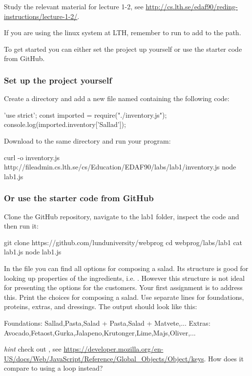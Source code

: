 \documentclass[fleqn, article, a4paper]{memoir}
\begin{document}
\begin{Assignments}

\item Study the relevant material for lecture 1-2, see \url{http://cs.lth.se/edaf90/reding-instructions/lecture-1-2/}. 

\item If you are using the linux system at LTH, remember to run  to add  to the path.

\item To get started you can either set the project up yourself or use the starter code from GitHub. 
\subsubsection{Set up the project yourself}
Create a directory and add a new file named  containing the following code:
\begin{Code}
'use strict';
const imported = require("./inventory.js");
console.log(imported.inventory['Sallad']);
\end{Code}
\noindent Download  to the same directory and run your  program:
\begin{Code}
curl -o inventory.js http://fileadmin.cs.lth.se/cs/Education/EDAF90/labs/lab1/inventory.js
node lab1.js
\end{Code}

\subsubsection{Or use the starter code from GitHub}
\noindent Clone the GitHub repository, navigate to the lab1 folder, inspect the code and then run it:

\begin{Code}
  git clone https://github.com/lunduniversity/webprog
  cd webprog/labs/lab1
  cat lab1.js
  node lab1.js
\end{Code}

\item In the  file you can find all options for composing a salad. Its structure is good for looking up properties of the ingredients, i.e. . However this structure is not ideal for presenting the options for the customers. Your first assignment is to address this. Print the choices for composing a salad. Use separate lines for foundations, proteins, extras, and dressings. The output should look like this:
\begin{Code}
Foundations: Sallad,Pasta,Salad + Pasta,Salad + Matvete,...
Extras: Avocado,Fetaost,Gurka,Jalapeno,Krutonger,Lime,Majs,Oliver,...
\end{Code}
\emph{hint} check out , see \url{https://developer.mozilla.org/en-US/docs/Web/JavaScript/Reference/Global_Objects/Object/keys}. How does it compare to using a  loop instead?


\end{Assignments}
\end{document}
